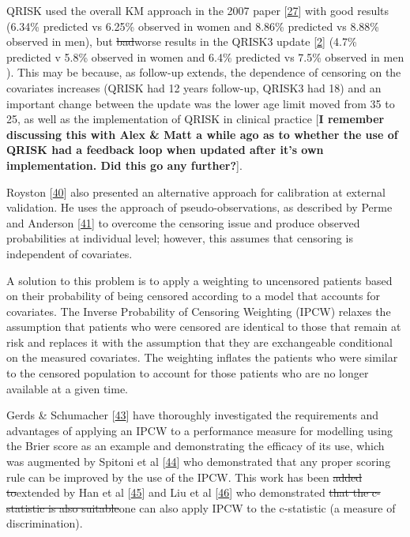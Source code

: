 \documentclass[12pt,PhD,twoside,openright]{muthesis}
\begin{document}
QRISK used the overall KM approach in the 2007 paper {[}\protect\hyperlink{ref-hippisley-cox_derivation_2007}{27}{]} with good results (6.34\% predicted vs 6.25\% observed in women and 8.86\% predicted vs 8.88\% observed in men), but \sout{bad}worse results in the QRISK3 update {[}\protect\hyperlink{ref-hippisley-cox_development_2017}{2}{]} (4.7\% predicted v 5.8\% observed in women and 6.4\% predicted vs 7.5\% observed in men ). This may be because, as follow-up extends, the dependence of censoring on the covariates increases (QRISK had 12 years follow-up, QRISK3 had 18) and an important change between the update was the lower age limit moved from 35 to 25, as well as the implementation of QRISK in clinical practice {[}\textbf{I remember discussing this with Alex \& Matt a while ago as to whether the use of QRISK had a feedback loop when updated after it's own implementation. Did this go any further?}{]}.

Royston {[}\protect\hyperlink{ref-royston_tools_2014}{40}{]} also presented an alternative approach for calibration at external validation. He uses the approach of pseudo-observations, as described by Perme and Anderson {[}\protect\hyperlink{ref-perme_checking_2008}{41}{]} to overcome the censoring issue and produce observed probabilities at individual level; however, this assumes that censoring is independent of covariates.

A solution to this problem is to apply a weighting to uncensored patients based on their probability of being censored according to a model that accounts for covariates. The Inverse Probability of Censoring Weighting (IPCW) relaxes the assumption that patients who were censored are identical to those that remain at risk and replaces it with the assumption that they are exchangeable conditional on the measured covariates. The weighting inflates the patients who were similar to the censored population to account for those patients who are no longer available at a given time.

Gerds \& Schumacher {[}\protect\hyperlink{ref-gerds_consistent_2006}{43}{]} have thoroughly investigated the requirements and advantages of applying an IPCW to a performance measure for modelling using the Brier score as an example and demonstrating the efficacy of its use, which was augmented by Spitoni et al {[}\protect\hyperlink{ref-spitoni_prediction_2018}{44}{]} who demonstrated that any proper scoring rule can be improved by the use of the IPCW. This work has been \sout{added to}extended by Han et al {[}\protect\hyperlink{ref-han_comparing_2017}{45}{]} and Liu et al {[}\protect\hyperlink{ref-liu_comparing_2016}{46}{]} who demonstrated \sout{that the c-statistic is also suitable}one can also apply IPCW to the c-statistic (a measure of discrimination).
\end{document}
